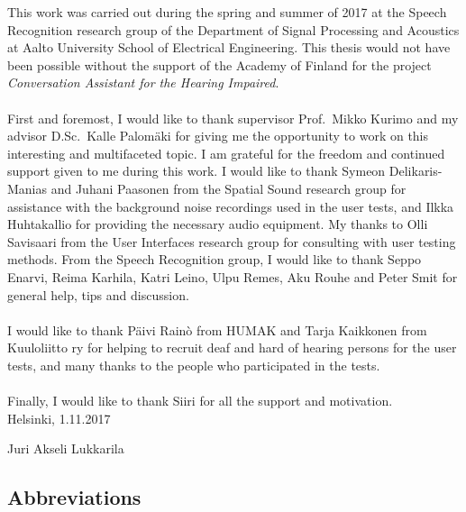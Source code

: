 \documentclass[english, 12pt, a4paper, pdftex, elec, utf8]{aaltothesis}
\begin{document}
This work was carried out during the spring and summer of 2017 at the Speech Recognition research group of the Department of Signal Processing and Acoustics at Aalto University School of Electrical Engineering. This thesis would not have been possible without the support of the Academy of Finland for the project \textit{Conversation Assistant for the Hearing Impaired}. \\\\
First and foremost, I would like to thank supervisor Prof.\ Mikko Kurimo and my advisor D.Sc.\ Kalle Palomäki for giving me the opportunity to work on this interesting and multifaceted topic. I am grateful for the freedom and continued support given to me during this work. I would like to thank Symeon Delikaris-Manias and Juhani Paasonen from the Spatial Sound research group for assistance with the background noise recordings used in the user tests, and Ilkka Huhtakallio for providing the necessary audio equipment. My thanks to Olli Savisaari from the User Interfaces research group for consulting with user testing methods. From the Speech Recognition group, I would like to thank Seppo Enarvi, Reima Karhila, Katri Leino, Ulpu Remes, Aku Rouhe and Peter Smit for general help, tips and discussion. \\\\
I would like to thank Päivi Rainò from HUMAK and Tarja Kaikkonen from Kuuloliitto ry for helping to recruit deaf and hard of hearing persons for the user tests, and many thanks to the people who participated in the tests. \\\\
Finally, I would like to thank Siiri for all the support and motivation. \\

\vspace{1cm}
\noindent Helsinki, 1.11.2017

\vspace{5mm}
\noindent Juri Akseli Lukkarila

\newpage

\thesistableofcontents


\subsection*{Abbreviations}
\end{document}
